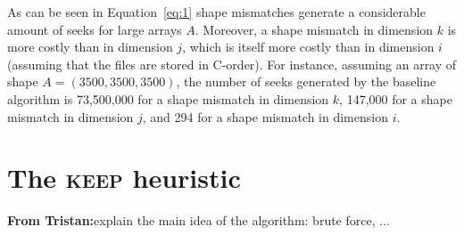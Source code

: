 \documentclass[sigconf, nonacm]{acmart}
\newcommand{\tristan}[1]{\color{orange}\textbf{From Tristan:}#1\color{black}}
\newcommand{\keep}[0]{\textsc{keep}\xspace}
\begin{document}
{As can be seen in Equation~\ref{eq:1} shape mismatches generate a considerable
 amount of seeks for large arrays $A$. Moreover, a shape mismatch in
 dimension $k$  is more costly than in  dimension $j$, which is itself more
 costly than in dimension $i$ (assuming that the files are stored in
 C-order). For instance, assuming an array of shape $A=(3500, 3500, 3500)$,
 the number of seeks generated by the baseline algorithm is 73,500,000 for a shape mismatch in dimension $k$, 
 147,000 for a shape mismatch in dimension $j$, and 294 for a shape mismatch in dimension $i$.






\section{The \keep heuristic}

\tristan{explain the main idea of the algorithm: brute force, ...}

}
\end{document}
